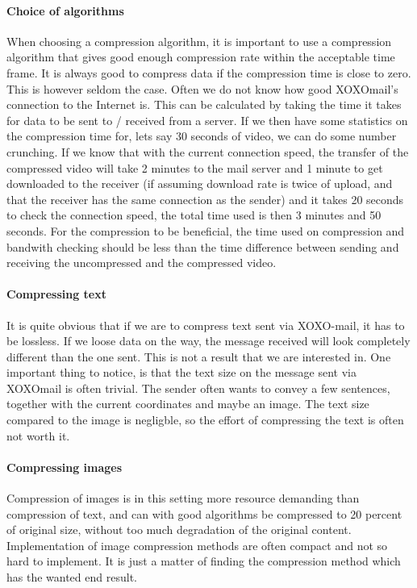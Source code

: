 \paragraph{Choice of algorithms}\hfill
\newline
When choosing a compression algorithm, it is important to use a compression algorithm that gives good enough compression rate within the acceptable time frame. It is always good to compress data if the compression time is close to zero. This is however seldom the case.
\newline
\newline
Often we do not know how good XOXOmail's connection to the Internet is. This can be calculated by taking the time it takes for data to be sent to / received from a server. If we then have some statistics on the compression time for, lets say 30 seconds of video, we can do some number crunching. If we know that with the current connection speed, the transfer of the compressed video will take 2 minutes to the mail server and 1 minute to get downloaded to the receiver (if assuming download rate is twice of upload, and that the receiver has the same connection as the sender) and it takes 20 seconds to check the connection speed, the total time used is then 3 minutes and 50 seconds. For the compression to be beneficial, the time used on compression and bandwith checking should be less than the time difference between sending and receiving the uncompressed and the compressed video.

\paragraph{Compressing text} \hfill
\newline
It is quite obvious that if we are to compress text sent via XOXO-mail, it has to be lossless. If we loose data on the way, the message received will look completely different than the one sent. This is not a result that we are interested in. One important thing to notice, is that the text size on the message sent via XOXOmail is often trivial. The sender often wants to convey a few sentences, together with the current coordinates and maybe an image. The text size compared to the image is negligble, so the effort of compressing the text is often not worth it. %

\paragraph{Compressing images} \hfill
\newline
Compression of images is in this setting more resource demanding than compression of text, and can with good algorithms be compressed to 20 percent of original size, without too much degradation of the original content. Implementation of image compression methods are often compact and not so hard to implement. It is just a matter of finding the compression method which has the wanted end result.

